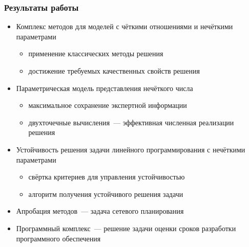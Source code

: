 \documentclass[12pt]{beamer}
\begin{document}



\begin{frame}
  \frametitle{Результаты работы}
  \begin{itemize}
    \item Комплекс методов для моделей с чёткими отношениями и нечёткими параметрами
    \begin{itemize}
      \item применение классических методы решения
      \item достижение требуемых качественных свойств решения
    \end{itemize}
    \item Параметрическая модель представления нечёткого числа
    \begin{itemize}
      \item максимальное сохранение экспертной информации
      \item двухточечные вычисления~--- эффективная численная реализации решения
    \end{itemize}
    \item Устойчивость решения задачи линейного программирования с нечёткими параметрами
    \begin{itemize}
      \item свёртка критериев для управления устойчивостью
      \item алгоритм получения устойчивого решения задачи
    \end{itemize}
    \item Апробация методов~--- задача сетевого планирования
    \item Программный комплекс~--- решение задачи оценки сроков разработки программного обеспечения
  \end{itemize}
\end{frame}
\end{document}
